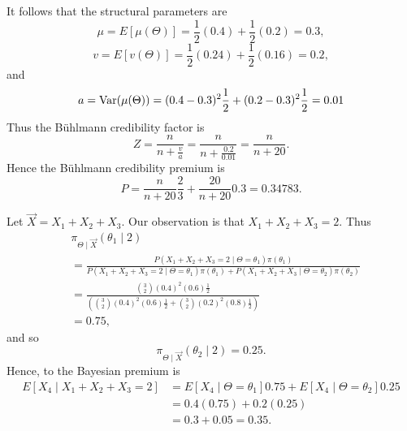 \documentclass[notoc,notitlepage]{tufte-book}
\begin{document}
\begin{solution}
  It follows that the structural parameters are
  \begin{equation*}
    \mu = E[\mu(\Theta)] = \frac{1}{2}(0.4) + \frac{1}{2}(0.2) = 0.3,
  \end{equation*}
  \begin{equation*}
    v = E[v(\Theta)] = \frac{1}{2}(0.24) + \frac{1}{2}(0.16) = 0.2,
  \end{equation*}
  and
  \begin{equation*}
    a = \operatorname{Var}(\mu(\Theta)) = (0.4 - 0.3)^2 \frac{1}{2} + (0.2 - 0.3)^2
    \frac{1}{2} = 0.01
  \end{equation*}
  Thus the B\"{u}hlmann credibility factor is
  \begin{equation*}
    Z = \frac{n}{n + \frac{v}{a}}
      = \frac{n}{n + \frac{0.2}{0.01}} = \frac{n}{n + 20}.
  \end{equation*}
  Hence the B\"{u}hlmann credibility premium is
  \begin{equation*}
    P = \frac{n}{n + 20} \frac{2}{3} + \frac{20}{n + 20} 0.3 = 0.34783.
  \end{equation*}

  \noindent
   Let $\vec{X} = X_1 + X_2 + X_3$. Our observation
  is that $X_1 + X_2 + X_3 = 2$. Thus
  \begin{align*}
    &\pi_{\Theta \mid \vec{X}}(\theta_1 \mid 2) \\
    &= \frac{P(X_1 + X_2 + X_3 = 2 \mid \Theta = \theta_1) \pi(\theta_1)}{P(X_1
      + X_2 + X_3 = 2 \mid \Theta = \theta_1) \pi(\theta_1) + P(X_1 + X_2 + X_3
      \mid \Theta = \theta_2) \pi(\theta_2)} \\
    &= \frac{\binom{3}{2}(0.4)^2(0.6)
      \frac{1}{2}}{(\binom{3}{2}(0.4)^2(0.6)\frac{1}{2} +
      \binom{3}{2}(0.2)^2(0.8)\frac{1}{2})} \\
    &= 0.75,
  \end{align*}
  and so
  \begin{equation*}
    \pi_{\Theta \mid \vec{X}}(\theta_2 \mid 2) = 0.25.
  \end{equation*}
  Hence, to the Bayesian premium is
  \begin{align*}
    E[X_4 \mid X_1 + X_2 + X_3 = 2]
    &= E[X_4 \mid \Theta = \theta_1] 0.75 + E[X_4 \mid \Theta = \theta_2] 0.25 \\
    &= 0.4 (0.75) + 0.2 (0.25) \\
    &= 0.3 + 0.05 = 0.35.
  \end{align*}
\end{solution}



\appendix

\backmatter

\fancyhead[LE]{\thepage \enspace \textsl{\leftmark}}



\printindex
\end{document}
